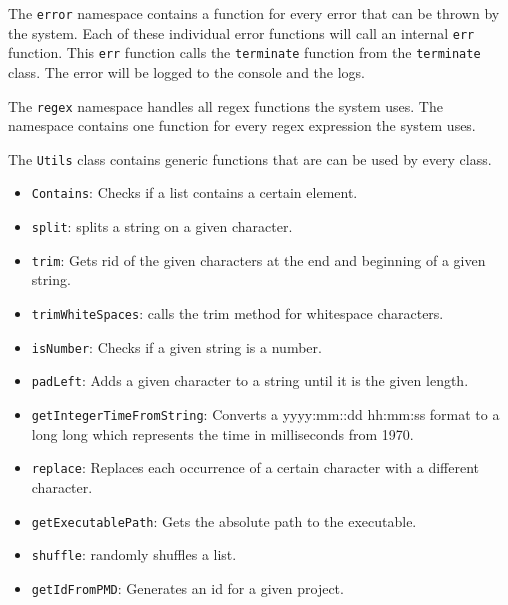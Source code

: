 \documentclass[../Main.tex]{subfiles}
\begin{document}
The \texttt{error} namespace contains a function for every error that can be thrown by the system. Each of these individual error functions will call an internal \texttt{err} function. This \texttt{err} function calls the \texttt{terminate} function from the \texttt{terminate} class. The error will be logged to the console and the logs.

The \texttt{regex} namespace handles all regex functions the system uses. The namespace contains one function for every regex expression the system uses.

The \texttt{Utils} class contains generic functions that are can be used by every class.
\begin{itemize}
    \item \texttt{Contains}: Checks if a list contains a certain element.
    \item \texttt{split}: splits a string on a given character.
    \item \texttt{trim}: Gets rid of the given characters at the end and beginning of a given string.
    \item \texttt{trimWhiteSpaces}: calls the trim method for whitespace characters.
    \item \texttt{isNumber}: Checks if a given string is a number.
    \item \texttt{padLeft}: Adds a given character to a string until it is the given length.
    \item \texttt{getIntegerTimeFromString}: Converts a yyyy:mm::dd hh:mm:ss format to a long long which represents the time in milliseconds from 1970.
    \item \texttt{replace}: Replaces each occurrence of a certain character with a different character.
    \item \texttt{getExecutablePath}: Gets the absolute path to the executable.
    \item \texttt{shuffle}: randomly shuffles a list.
    \item \texttt{getIdFromPMD}: Generates an id for a given project.
\end{itemize}
\end{document}
